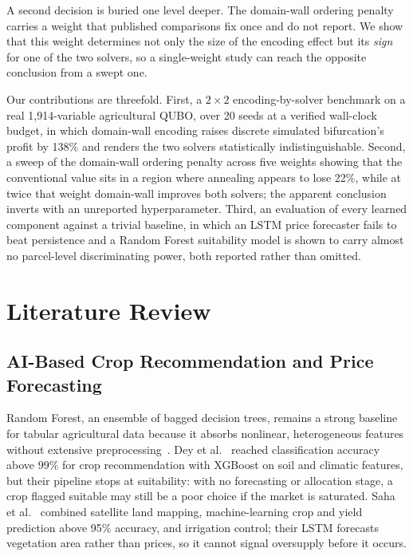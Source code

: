 \documentclass[conference,a4paper]{IEEEtran}
\begin{document}
A second decision is buried one level deeper. The domain-wall ordering penalty
carries a weight that published comparisons fix once and do not report. We
show that this weight determines not only the size of the encoding effect but
its \emph{sign} for one of the two solvers, so a single-weight study can reach
the opposite conclusion from a swept one.

Our contributions are threefold. First, a $2\times2$ encoding-by-solver
benchmark on a real 1{,}914-variable agricultural QUBO, over 20 seeds at a
verified wall-clock budget, in which domain-wall encoding raises discrete
simulated bifurcation's profit by 138\% and renders the two solvers
statistically indistinguishable. Second, a sweep of the domain-wall ordering
penalty across five weights showing that the conventional value sits in a
region where annealing appears to lose 22\%, while at twice that weight
domain-wall improves both solvers; the apparent conclusion inverts with an
unreported hyperparameter. Third, an evaluation of every learned component
against a trivial baseline, in which an LSTM price forecaster fails to beat
persistence and a Random Forest suitability model is shown to carry almost no
parcel-level discriminating power, both reported rather than omitted.

\section{Literature Review}
\label{sec:lit}

\subsection{AI-Based Crop Recommendation and Price Forecasting}

Random Forest, an ensemble of bagged decision trees, remains a strong baseline
for tabular agricultural data because it absorbs nonlinear, heterogeneous
features without extensive preprocessing~\cite{breiman2001}. Dey et
al.~\cite{dey2024} reached classification accuracy above 99\% for crop
recommendation with XGBoost on soil and climatic features, but their pipeline
stops at suitability: with no forecasting or allocation stage, a crop flagged
suitable may still be a poor choice if the market is saturated. Saha et
al.~\cite{saha2025} combined satellite land mapping, machine-learning crop and
yield prediction above 95\% accuracy, and irrigation control; their LSTM
forecasts vegetation area rather than prices, so it cannot signal oversupply
before it occurs.
\end{document}
